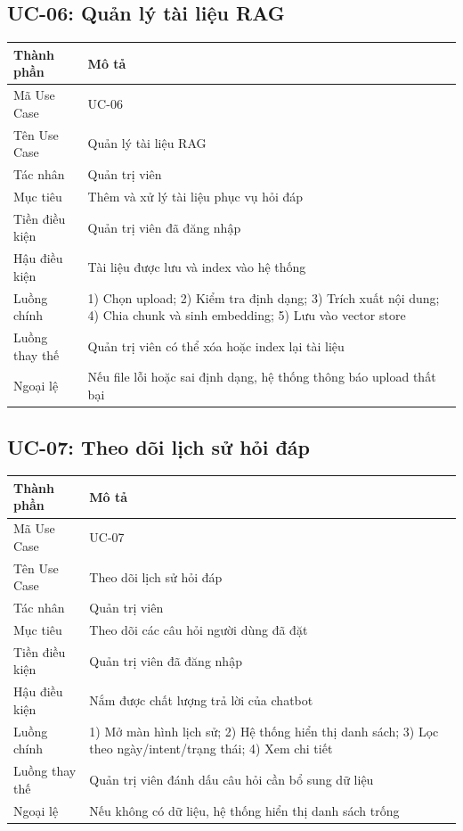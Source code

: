 \subsection{UC-06: Quản lý tài liệu RAG}
\begin{table}[H]
\centering
\begin{tabular}{|p{3.5cm}|p{8.5cm}|}
\hline
\textbf{Thành phần} & \textbf{Mô tả} \\ \hline
Mã Use Case & UC-06 \\ \hline
Tên Use Case & Quản lý tài liệu RAG \\ \hline
Tác nhân & Quản trị viên \\ \hline
Mục tiêu & Thêm và xử lý tài liệu phục vụ hỏi đáp \\ \hline
Tiền điều kiện & Quản trị viên đã đăng nhập \\ \hline
Hậu điều kiện & Tài liệu được lưu và index vào hệ thống \\ \hline
Luồng chính & 1) Chọn upload; 2) Kiểm tra định dạng; 3) Trích xuất nội dung; 4) Chia chunk và sinh embedding; 5) Lưu vào vector store \\ \hline
Luồng thay thế & Quản trị viên có thể xóa hoặc index lại tài liệu \\ \hline
Ngoại lệ & Nếu file lỗi hoặc sai định dạng, hệ thống thông báo upload thất bại \\ \hline
\end{tabular}
\end{table}

\subsection{UC-07: Theo dõi lịch sử hỏi đáp}
\begin{table}[H]
\centering
\begin{tabular}{|p{3.5cm}|p{8.5cm}|}
\hline
\textbf{Thành phần} & \textbf{Mô tả} \\ \hline
Mã Use Case & UC-07 \\ \hline
Tên Use Case & Theo dõi lịch sử hỏi đáp \\ \hline
Tác nhân & Quản trị viên \\ \hline
Mục tiêu & Theo dõi các câu hỏi người dùng đã đặt \\ \hline
Tiền điều kiện & Quản trị viên đã đăng nhập \\ \hline
Hậu điều kiện & Nắm được chất lượng trả lời của chatbot \\ \hline
Luồng chính & 1) Mở màn hình lịch sử; 2) Hệ thống hiển thị danh sách; 3) Lọc theo ngày/intent/trạng thái; 4) Xem chi tiết \\ \hline
Luồng thay thế & Quản trị viên đánh dấu câu hỏi cần bổ sung dữ liệu \\ \hline
Ngoại lệ & Nếu không có dữ liệu, hệ thống hiển thị danh sách trống \\ \hline
\end{tabular}
\end{table}
